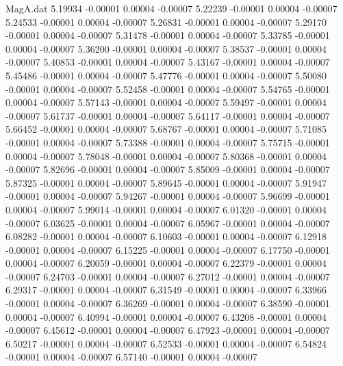 \begin{filecontents}{MagA.dat}
   5.19934   -0.00001    0.00004   -0.00007
   5.22239   -0.00001    0.00004   -0.00007
   5.24533   -0.00001    0.00004   -0.00007
   5.26831   -0.00001    0.00004   -0.00007
   5.29170   -0.00001    0.00004   -0.00007
   5.31478   -0.00001    0.00004   -0.00007
   5.33785   -0.00001    0.00004   -0.00007
   5.36200   -0.00001    0.00004   -0.00007
   5.38537   -0.00001    0.00004   -0.00007
   5.40853   -0.00001    0.00004   -0.00007
   5.43167   -0.00001    0.00004   -0.00007
   5.45486   -0.00001    0.00004   -0.00007
   5.47776   -0.00001    0.00004   -0.00007
   5.50080   -0.00001    0.00004   -0.00007
   5.52458   -0.00001    0.00004   -0.00007
   5.54765   -0.00001    0.00004   -0.00007
   5.57143   -0.00001    0.00004   -0.00007
   5.59497   -0.00001    0.00004   -0.00007
   5.61737   -0.00001    0.00004   -0.00007
   5.64117   -0.00001    0.00004   -0.00007
   5.66452   -0.00001    0.00004   -0.00007
   5.68767   -0.00001    0.00004   -0.00007
   5.71085   -0.00001    0.00004   -0.00007
   5.73388   -0.00001    0.00004   -0.00007
   5.75715   -0.00001    0.00004   -0.00007
   5.78048   -0.00001    0.00004   -0.00007
   5.80368   -0.00001    0.00004   -0.00007
   5.82696   -0.00001    0.00004   -0.00007
   5.85009   -0.00001    0.00004   -0.00007
   5.87325   -0.00001    0.00004   -0.00007
   5.89645   -0.00001    0.00004   -0.00007
   5.91947   -0.00001    0.00004   -0.00007
   5.94267   -0.00001    0.00004   -0.00007
   5.96699   -0.00001    0.00004   -0.00007
   5.99014   -0.00001    0.00004   -0.00007
   6.01320   -0.00001    0.00004   -0.00007
   6.03625   -0.00001    0.00004   -0.00007
   6.05967   -0.00001    0.00004   -0.00007
   6.08282   -0.00001    0.00004   -0.00007
   6.10603   -0.00001    0.00004   -0.00007
   6.12918   -0.00001    0.00004   -0.00007
   6.15225   -0.00001    0.00004   -0.00007
   6.17750   -0.00001    0.00004   -0.00007
   6.20059   -0.00001    0.00004   -0.00007
   6.22379   -0.00001    0.00004   -0.00007
   6.24703   -0.00001    0.00004   -0.00007
   6.27012   -0.00001    0.00004   -0.00007
   6.29317   -0.00001    0.00004   -0.00007
   6.31549   -0.00001    0.00004   -0.00007
   6.33966   -0.00001    0.00004   -0.00007
   6.36269   -0.00001    0.00004   -0.00007
   6.38590   -0.00001    0.00004   -0.00007
   6.40994   -0.00001    0.00004   -0.00007
   6.43208   -0.00001    0.00004   -0.00007
   6.45612   -0.00001    0.00004   -0.00007
   6.47923   -0.00001    0.00004   -0.00007
   6.50217   -0.00001    0.00004   -0.00007
   6.52533   -0.00001    0.00004   -0.00007
   6.54824   -0.00001    0.00004   -0.00007
   6.57140   -0.00001    0.00004   -0.00007

\end{filecontents}
